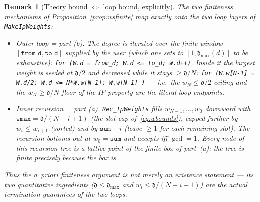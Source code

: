 \documentclass{amsart}
\newtheorem{remark}[theorem]{Remark}
\begin{document}
\begin{remark}[Theory bound $\Leftrightarrow$ loop bound, explicitly]
\label{rmk:boundmatch}
The two finiteness mechanisms of Proposition~\ref{prop:wsfinite} map
\emph{exactly} onto the two loop layers of \texttt{MakeIpWeights}:
\begin{itemize}
  \item \emph{Outer loop = part (b).} The degree is iterated over the finite
        window $[\texttt{from\_d},\texttt{to\_d}]$ supplied by the user
        (which one sets to $[1,\mathfrak d_{\max}(d)]$ to be exhaustive):
        \texttt{for (W.d = from\_d; W.d <= to\_d; W.d++)}.
        Inside it the largest weight is seeded at $\mathfrak d/2$ and decreased
        while it stays $\ge \mathfrak d/N$:
        \texttt{for (W.w[N-1] = W.d/2; W.d <= N*W.w[N-1]; W.w[N-1]--)} ---
        i.e.\ the $w_N\le\mathfrak d/2$ ceiling and the $w_N\ge\mathfrak d/N$
        floor of the IP property are the literal loop endpoints.
  \item \emph{Inner recursion = part (a).} \texttt{Rec\_IpWeights} fills
        $w_{N-1},\dots,w_0$ downward with $\texttt{wmax} = \mathfrak
        d/(N-i+1)$ (the slot cap of~\eqref{eq:wbounds}), capped further by
        $w_i\le w_{i+1}$ (sorted) and by $\texttt{sum}-i$ (leave $\ge 1$ for
        each remaining slot). The recursion bottoms out at $w_0=\texttt{sum}$
        and accepts iff $\gcd=1$. Every node of this recursion tree is a
        lattice point of the finite box of part~(a); the tree is finite
        precisely \emph{because} the box is.
\end{itemize}
Thus the a~priori finiteness argument is not merely an existence statement ---
its two quantitative ingredients ($\mathfrak d\le\mathfrak d_{\max}$ and
$w_i\le\mathfrak d/(N-i+1)$) are the actual termination guarantees of the two
loops.
\end{remark}
\end{document}
